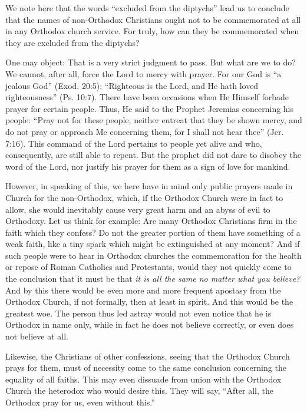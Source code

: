 We note here that the words ``excluded from the diptychs'' lead us to conclude that the names of non-Orthodox Christians ought not to be commemorated at all in any Orthodox church service. For truly, how can they be commemorated when they are excluded from the diptychs?

One may object: That is a very strict judgment to pass. But what are we to do? We cannot, after all, force the Lord to mercy with prayer. For our God is ``a jealous God'' (Exod. 20:5); ``Righteous is the Lord, and He hath loved righteousness'' (Ps. 10:7). There have been occasions when He Himself forbade prayer for certain people. Thus, He said to the Prophet Jeremias concerning his people: ``Pray not for these people, neither entreat that they be shown mercy, and do not pray or approach Me concerning them, for I shall not hear thee'' (Jer. 7:16). This command of the Lord pertains to people yet alive and who, consequently, are still able to repent. But the prophet did not dare to disobey the word of the Lord, nor justify his prayer for them as a sign of love for mankind.

However, in speaking of this, we here have in mind only public prayers made in Church for the non-Orthodox, which, if the Orthodox Church were in fact to allow, she would inevitably cause very great harm and an abyss of evil to Orthodoxy. Let us think for example: Are many Orthodox Christians firm in the faith which they confess? Do not the greater portion of them have something of a weak faith, like a tiny spark which might be extinguished at any moment? And if such people were to hear in Orthodox churches the commemoration for the health or repose of Roman Catholics and Protestants, would they not quickly come to the conclusion that it must be that \textit{it is all the same no matter what you believe?} And by this there would be even more and more frequent apostasy from the Orthodox Church, if not formally, then at least in spirit. And this would be the greatest woe. The person thus led astray would not even notice that he is Orthodox in name only, while in fact he does not believe correctly, or even does not believe at all.

Likewise, the Christians of other confessions, seeing that the Orthodox Church prays for them, must of necessity come to the same conclusion concerning the equality of all faiths. This may even dissuade from union with the Orthodox Church the heterodox who would desire this. They will say, ``After all, the Orthodox pray for us, even without this.''

